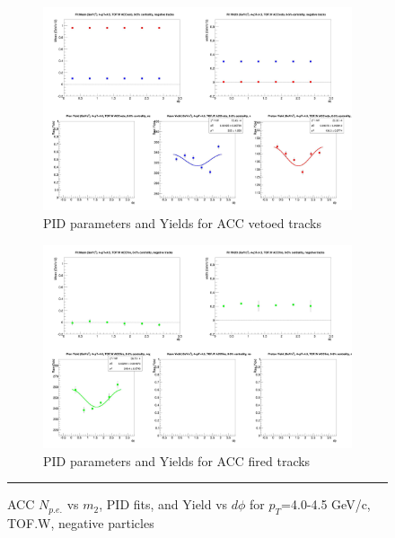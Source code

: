 \begin{figure}[H]
  \ContinuedFloat
    \begin{subfigure}{1\textwidth}
    \includegraphics[width=1\textwidth]{hiptfits/neg/fitParams_tof2_cent0_ch0_pT-40-45.jpg}
    \caption{PID parameters and Yields for ACC vetoed tracks}
    \end{subfigure}    
    \begin{subfigure}{1\textwidth}
    \includegraphics[width=1\textwidth]{hiptfits/neg/fitParams_tof3_cent0_ch0_pT-40-45.jpg}
    \caption{PID parameters and Yields for ACC fired tracks}
    \end{subfigure} 
    \rule{35em}{0.5pt}
  \caption[ACC $N_{p.e.}$ vs $m_2$, PID fits, and Yield vs $d\phi$ for $p_T$=4.0-4.5 GeV/c, TOF.W, negative particles]{ACC $N_{p.e.}$ vs $m_2$, PID fits, and Yield vs $d\phi$ for $p_T$=4.0-4.5 GeV/c, TOF.W, negative particles}
  \label{fig:acc40-45neg}
\end{figure}


